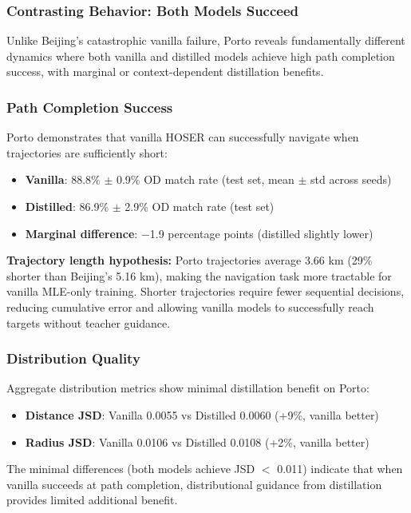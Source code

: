 \subsubsection{Contrasting Behavior: Both Models Succeed}

Unlike Beijing's catastrophic vanilla failure, Porto reveals fundamentally different dynamics where both vanilla and distilled models achieve high path completion success, with marginal or context-dependent distillation benefits.

\subsubsection{Path Completion Success}

Porto demonstrates that vanilla HOSER can successfully navigate when trajectories are sufficiently short:
\begin{itemize}[leftmargin=*,noitemsep]
    \item \textbf{Vanilla}: 88.8\% $\pm$ 0.9\% OD match rate (test set, mean $\pm$ std across seeds)
    \item \textbf{Distilled}: 86.9\% $\pm$ 2.9\% OD match rate (test set)
    \item \textbf{Marginal difference}: $-$1.9 percentage points (distilled slightly lower)
\end{itemize}

\textbf{Trajectory length hypothesis:} Porto trajectories average 3.66 km (29\% shorter than Beijing's 5.16 km), making the navigation task more tractable for vanilla MLE-only training. Shorter trajectories require fewer sequential decisions, reducing cumulative error and allowing vanilla models to successfully reach targets without teacher guidance.

\subsubsection{Distribution Quality}

Aggregate distribution metrics show minimal distillation benefit on Porto:
\begin{itemize}[leftmargin=*,noitemsep]
    \item \textbf{Distance JSD}: Vanilla 0.0055 vs Distilled 0.0060 (+9\%, vanilla better)
    \item \textbf{Radius JSD}: Vanilla 0.0106 vs Distilled 0.0108 (+2\%, vanilla better)
\end{itemize}

The minimal differences (both models achieve JSD $<$ 0.011) indicate that when vanilla succeeds at path completion, distributional guidance from distillation provides limited additional benefit.


